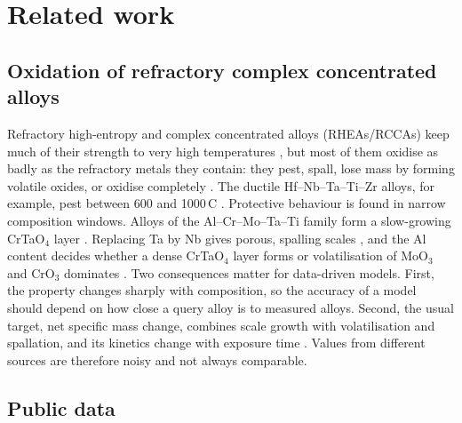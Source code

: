\section{Related work}
\label{sec:related}

\subsection{Oxidation of refractory complex concentrated alloys}

Refractory high-entropy and complex concentrated alloys (RHEAs/RCCAs) keep much of their strength
to very high temperatures \citep{senkov2018review,senkov2019high}, but most of them oxidise as
badly as the refractory metals they contain: they pest, spall, lose mass by forming volatile oxides,
or oxidise completely \citep{gorr2021review}. The ductile Hf--Nb--Ta--Ti--Zr alloys, for example,
pest between 600 and 1000\,\textdegree C \citep{sheikh2018pesting}. Protective behaviour is found in
narrow composition windows. Alloys of the Al--Cr--Mo--Ta--Ti family form a slow-growing CrTaO$_4$
layer \citep{gorr2020crtao4,lo2019crtao4}. Replacing Ta by Nb gives porous, spalling scales
\citep{muller2019mechanism}, and the Al content decides whether a dense CrTaO$_4$ layer forms or
volatilisation of MoO$_3$ and CrO$_3$ dominates \citep{schellert2021al}. Two consequences matter
for data-driven models. First, the property changes sharply with composition, so the accuracy of a
model should depend on how close a query alloy is to measured alloys. Second, the usual target,
net specific mass change, combines scale growth with volatilisation and spallation, and its kinetics
change with exposure time \citep{lo2019crtao4}. Values from different sources are therefore noisy
and not always comparable.

\subsection{Public data}

